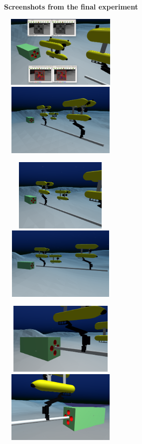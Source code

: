 \begin{figure}[H]
	\centering
	\textbf{Screenshots from the final experiment }\\
	\vspace{5px}
	\centerline{
		\includegraphics[width=6cm, height=3.5cm]{screenUWSIM/1new.png}
		\includegraphics[width=6cm, height=3.5cm]{screenUWSIM/2New.png}
	}
	\vspace{1px}
	\centerline{
		\includegraphics[width=6cm, height=3.5cm]{screenUWSIM/3.png}
		\includegraphics[width=6cm, height=3.5cm]{screenUWSIM/4.png}
	}
		\vspace{1px}
	\centerline{
		\includegraphics[width=6cm,height=3.5cm]{screenUWSIM/5.png}
		\includegraphics[width=6cm, height=3.5cm]{screenUWSIM/6.png}
}
\end{figure}

